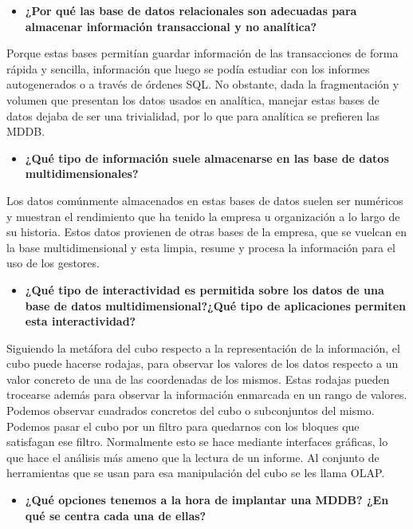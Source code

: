 \documentclass[paper=a4, fontsize=11pt]{scrartcl} %
\begin{document}
\begin{itemize}
\item \textbf{¿Por qué las base de datos relacionales son adecuadas para almacenar información transaccional y no analítica?}
\end{itemize}
Porque estas bases permitían guardar información de las transacciones de forma rápida y sencilla, información que luego se podía estudiar con los informes autogenerados o a través de órdenes SQL. No obstante, dada la fragmentación y volumen que presentan los datos usados en analítica, manejar estas bases de datos dejaba de ser una trivialidad, por lo que para analítica se prefieren las MDDB.

\begin{itemize}
\item \textbf{ ¿Qué tipo de información suele almacenarse en las base de datos multidimensionales?}
\end{itemize}
Los datos comúnmente almacenados en estas bases de datos suelen ser numéricos y muestran el rendimiento que ha tenido la empresa u organización a lo largo de su historia. Estos datos provienen de otras bases de la empresa, que se vuelcan en la base multidimensional y esta limpia, resume y procesa la información para el uso de los gestores.

\begin{itemize}
\item \textbf{ ¿Qué tipo de interactividad es permitida sobre los datos de una base de datos multidimensional?¿Qué tipo de aplicaciones permiten esta interactividad?}
\end{itemize}
Siguiendo la metáfora del cubo respecto a la representación de la información, el cubo puede hacerse rodajas, para observar los valores de los datos respecto a un valor concreto de una de las coordenadas de los mismos. Estas rodajas pueden trocearse además para observar la información enmarcada en un rango de valores. Podemos observar cuadrados concretos del cubo o subconjuntos del mismo. Podemos pasar el cubo por un filtro para quedarnos con los bloques que satisfagan ese filtro. Normalmente esto se hace mediante interfaces gráficas, lo que hace el análisis más ameno que la lectura de un informe. Al conjunto de herramientas que se usan para esa manipulación del cubo se les llama OLAP. 

\begin{itemize}
\item \textbf{¿Qué opciones tenemos a la hora de implantar una MDDB? ¿En qué se centra cada una de ellas?}
\end{itemize}
\end{document}
